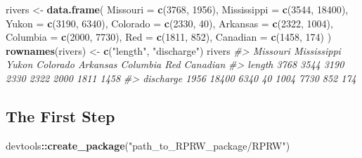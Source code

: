 \documentclass[
]{book}
\newenvironment{Shaded}{\begin{snugshade}}{\end{snugshade}}
\newcommand{\CommentTok}[1]{\textcolor[rgb]{0.56,0.35,0.01}{\textit{#1}}}
\newcommand{\DataTypeTok}[1]{\textcolor[rgb]{0.13,0.29,0.53}{#1}}
\newcommand{\DecValTok}[1]{\textcolor[rgb]{0.00,0.00,0.81}{#1}}
\newcommand{\KeywordTok}[1]{\textcolor[rgb]{0.13,0.29,0.53}{\textbf{#1}}}
\newcommand{\NormalTok}[1]{#1}
\newcommand{\OperatorTok}[1]{\textcolor[rgb]{0.81,0.36,0.00}{\textbf{#1}}}
\newcommand{\StringTok}[1]{\textcolor[rgb]{0.31,0.60,0.02}{#1}}
\begin{document}
\begin{Shaded}
\begin{Highlighting}[]
\NormalTok{rivers <-}\StringTok{ }\KeywordTok{data.frame}\NormalTok{(}
  \DataTypeTok{Missouri =} \KeywordTok{c}\NormalTok{(}\DecValTok{3768}\NormalTok{, }\DecValTok{1956}\NormalTok{),}
  \DataTypeTok{Mississippi =} \KeywordTok{c}\NormalTok{(}\DecValTok{3544}\NormalTok{, }\DecValTok{18400}\NormalTok{),}
  \DataTypeTok{Yukon =} \KeywordTok{c}\NormalTok{(}\DecValTok{3190}\NormalTok{, }\DecValTok{6340}\NormalTok{),}
  \DataTypeTok{Colorado =} \KeywordTok{c}\NormalTok{(}\DecValTok{2330}\NormalTok{, }\DecValTok{40}\NormalTok{),}
  \DataTypeTok{Arkansas =} \KeywordTok{c}\NormalTok{(}\DecValTok{2322}\NormalTok{, }\DecValTok{1004}\NormalTok{),}
  \DataTypeTok{Columbia =} \KeywordTok{c}\NormalTok{(}\DecValTok{2000}\NormalTok{, }\DecValTok{7730}\NormalTok{),}
  \DataTypeTok{Red =} \KeywordTok{c}\NormalTok{(}\DecValTok{1811}\NormalTok{, }\DecValTok{852}\NormalTok{),}
  \DataTypeTok{Canadian =} \KeywordTok{c}\NormalTok{(}\DecValTok{1458}\NormalTok{, }\DecValTok{174}\NormalTok{)}
\NormalTok{) }
\KeywordTok{rownames}\NormalTok{(rivers) <-}\StringTok{ }\KeywordTok{c}\NormalTok{(}\StringTok{"length"}\NormalTok{, }\StringTok{"discharge"}\NormalTok{)}
\NormalTok{rivers}
\CommentTok{#>           Missouri Mississippi Yukon Colorado Arkansas Columbia  Red Canadian}
\CommentTok{#> length        3768        3544  3190     2330     2322     2000 1811     1458}
\CommentTok{#> discharge     1956       18400  6340       40     1004     7730  852      174}
\end{Highlighting}
\end{Shaded}

\hypertarget{the-first-step}{%
\subsection{The First Step}\label{the-first-step}}

\begin{Shaded}
\begin{Highlighting}[]
\NormalTok{devtools}\OperatorTok{::}\KeywordTok{create_package}\NormalTok{(}\StringTok{"path_to_RPRW_package/RPRW"}\NormalTok{)}
\end{Highlighting}
\end{Shaded}
\end{document}
